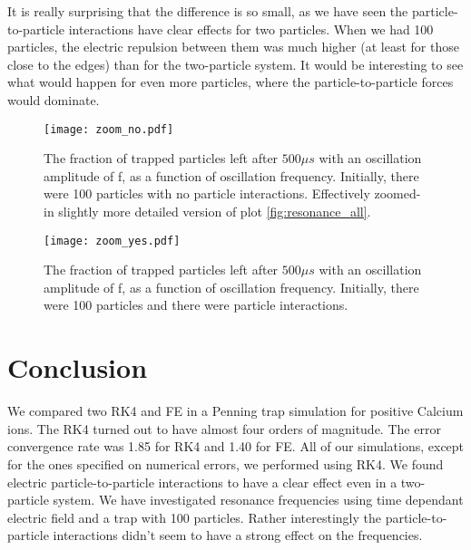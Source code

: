 \documentclass[english,notitlepage,reprint,nofootinbib]{revtex4-1}
\begin{document}
It is really surprising that the difference is so small, as we have seen the particle-to-particle interactions have clear effects for two particles. When we had 100 particles, the electric repulsion between them was much higher (at least for those close to the edges) than for the two-particle system. It would be interesting to see what would happen for even more particles, where the particle-to-particle forces would dominate.



\FloatBarrier
\begin{figure}[ht]
    \centering %
    \texttt{[image: zoom\_no.pdf]} %
    \caption{The fraction of trapped particles left after $500 \mu s$ with an oscillation amplitude of f, as a function of oscillation frequency. Initially, there were 100 particles with no particle interactions. Effectively zoomed-in slightly more detailed version of plot \ref{fig:resonance_all}.}
    \label{fig:zoom_no}
\end{figure}
\FloatBarrier
\FloatBarrier
\begin{figure}[ht]
    \centering %
    \texttt{[image: zoom\_yes.pdf]} %
    \caption{The fraction of trapped particles left after $500 \mu s$ with an oscillation amplitude of f, as a function of oscillation frequency. Initially, there were 100 particles and there were particle interactions.}
    \label{fig:zoom_yes}
\end{figure}
\FloatBarrier






\section{Conclusion}\label{sec:conclusion}

We compared two RK4 and FE in a Penning trap simulation for positive Calcium ions. The RK4 turned out to have almost four orders of magnitude. The error convergence rate was 1.85 for RK4 and 1.40 for FE. All of our simulations, except for the ones specified on numerical errors, we performed using RK4. We found electric particle-to-particle interactions to have a clear effect even in a two-particle system. We have investigated resonance frequencies using time dependant electric field and a trap with 100 particles. Rather interestingly the particle-to-particle interactions didn't seem to have a strong effect on the frequencies. 
\end{document}
